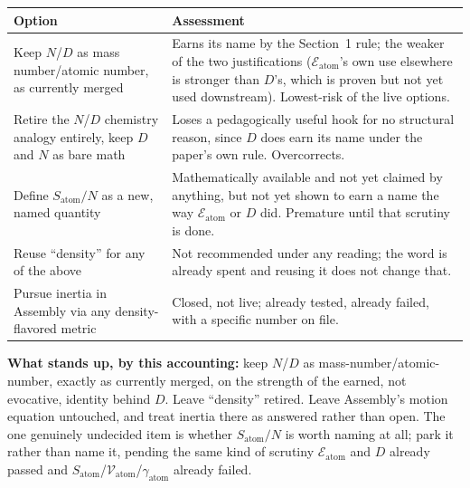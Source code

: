 \documentclass[11pt]{article}
\begin{document}
\begin{center}
\begin{tabular}{p{4.3cm}p{8.3cm}}
Option & Assessment \\
\hline
Keep $N$/$D$ as mass number/atomic number, as currently merged &
Earns its name by the Section~1 rule; the weaker of the two
justifications ($\mathcal{E}_{\text{atom}}$'s own use elsewhere is
stronger than $D$'s, which is proven but not yet used downstream).
Lowest-risk of the live options. \\
Retire the $N$/$D$ chemistry analogy entirely, keep $D$ and $N$ as
bare math & Loses a pedagogically useful hook for no structural
reason, since $D$ does earn its name under the paper's own rule.
Overcorrects. \\
Define $S_{\text{atom}}/N$ as a new, named quantity & Mathematically
available and not yet claimed by anything, but not yet shown to earn
a name the way $\mathcal{E}_{\text{atom}}$ or $D$ did. Premature until
that scrutiny is done. \\
Reuse ``density'' for any of the above & Not recommended under any
reading; the word is already spent and reusing it does not change
that. \\
Pursue inertia in Assembly via any density-flavored metric & Closed,
not live; already tested, already failed, with a specific number
on file. \\
\end{tabular}
\end{center}

\textbf{What stands up, by this accounting:} keep $N$/$D$ as
mass-number/atomic-number, exactly as currently merged, on the
strength of the earned, not evocative, identity behind $D$. Leave
``density'' retired. Leave Assembly's motion equation untouched, and
treat inertia there as answered rather than open. The one genuinely
undecided item is whether $S_{\text{atom}}/N$ is worth naming at
all; park it rather than name it, pending the same kind of scrutiny
$\mathcal{E}_{\text{atom}}$ and $D$ already passed and
$S_{\text{atom}}$/$\mathcal{V}_{\text{atom}}$/$\gamma_{\text{atom}}$
already failed.
\end{document}
